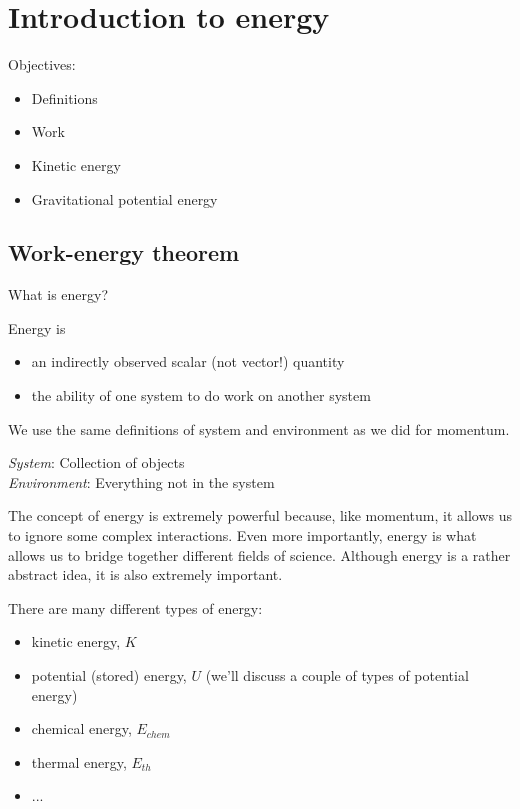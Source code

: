 \section{Introduction to energy}
Objectives:
\begin{itemize}
\item Definitions
\item Work
\item Kinetic energy
\item Gravitational potential energy
\end{itemize}

\subsection{Work-energy theorem}
What is energy? 


Energy is
\begin{itemize}
\item an indirectly observed scalar (not vector!) quantity
\item the ability of one system to do work on another system
\end{itemize}

We use the same definitions of system and environment as we did for momentum.

\textit{System}: Collection of objects\\
\textit{Environment}: Everything not in the system

The concept of energy is extremely powerful because, like momentum, it allows us to ignore some complex interactions. Even more importantly, energy is what allows us to bridge together different fields of science. Although energy is a rather abstract idea, it is also extremely important. 

There are many different types of energy:
\begin{itemize}
\item kinetic energy, $K$
\item potential (stored) energy, $U$ (we'll discuss a couple of types of potential energy)
\item chemical energy, $E_{chem}$
\item thermal energy, $E_{th}$
\item ...
\end{itemize}

